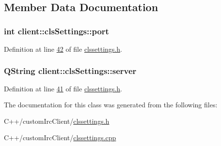 \subsection{Member Data Documentation}
\hypertarget{classclient_1_1cls_settings_a20136a6f81cb641f096b262f33f4a3b2}{
\subsubsection[{port}]{\setlength{\rightskip}{0pt plus 5cm}int client\-::cls\-Settings\-::port\hspace{0.3cm}{\ttfamily [private]}}}\label{d5/d08/classclient_1_1cls_settings_a20136a6f81cb641f096b262f33f4a3b2}


Definition at line \hyperlink{custom_irc_client_2clssettings_8h_source_l00042}{42} of file \hyperlink{custom_irc_client_2clssettings_8h_source}{clssettings.\-h}.

\hypertarget{classclient_1_1cls_settings_adfc1a3a273bdb599bbaec0ba345c1f3b}{
\subsubsection[{server}]{\setlength{\rightskip}{0pt plus 5cm}Q\-String client\-::cls\-Settings\-::server\hspace{0.3cm}{\ttfamily [private]}}}\label{d5/d08/classclient_1_1cls_settings_adfc1a3a273bdb599bbaec0ba345c1f3b}


Definition at line \hyperlink{custom_irc_client_2clssettings_8h_source_l00041}{41} of file \hyperlink{custom_irc_client_2clssettings_8h_source}{clssettings.\-h}.



The documentation for this class was generated from the following files\-:\begin{DoxyCompactItemize}
\item 
C++/custom\-Irc\-Client/\hyperlink{custom_irc_client_2clssettings_8h}{clssettings.\-h}\item 
C++/custom\-Irc\-Client/\hyperlink{custom_irc_client_2clssettings_8cpp}{clssettings.\-cpp}\end{DoxyCompactItemize}

